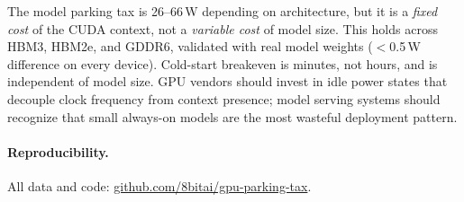 \documentclass[sigconf,nonacm]{acmart}
\begin{document}
The model parking tax is 26--66\,W depending on architecture, but it is a \emph{fixed cost} of the CUDA context, not a \emph{variable cost} of model size. This holds across HBM3, HBM2e, and GDDR6, validated with real model weights ($<$0.5\,W difference on every device). Cold-start breakeven is minutes, not hours, and is independent of model size. GPU vendors should invest in idle power states that decouple clock frequency from context presence; model serving systems should recognize that small always-on models are the most wasteful deployment pattern.

\paragraph{Reproducibility.} All data and code: \href{https://github.com/8bitai/gpu-parking-tax}{github.com/8bitai/gpu-parking-tax}.
\end{document}
